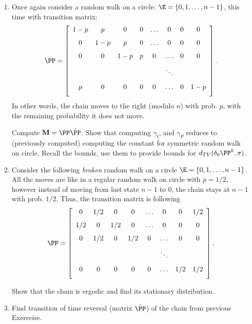 \documentclass[a4paper,12pt]{article}
\begin{document}
 
\noindent
 {
\setlength\fboxsep{4pt}%
 \setlength\fboxrule{2pt}%
 } \bigskip\bigskip
\par \bigskip

  


\begin{enumerate}
 \item Once again consider a random walk on a circle: $\E=\{0,1,\ldots,n-1\}$, this time 
 with transition matrix:
 $$\PP=\left[
 \begin{array}{ccccccccc}
 1-p & p & 0 & 0  & \ldots & 0& 0 & 0\\[7pt]
 0 & 1-p & p & 0 & \ldots & 0 &0&0\\[7pt]
 0 & 0 & 1-p & p & 0 &\ldots & 0 &0\\[7pt]
   &    &     &   &   & \ddots & & \\[7pt]
 p & 0 & 0 & 0 & 0 &\ldots & 0 &1-p\\[7pt]
 \end{array}\right].$$
 In other words, the chain moves to the right (modulo $n$) with prob. $p$, with the remaining 
 probability it does not move.
 
 \par 
 
 Compute  $\mathbf{M}=\PP\tilde{\PP}$. Show that computing 
  $\gamma_C$ and $\gamma_P$ reduces to (previously computed) computing the constant for 
  symmetric random walk on circle. Recall the bounds, use them 
  to provide  bounds for  $d_{TV}(\delta_0\PP^k,\pi)$.
  
  
  \item Consider the following \textsl{broken} random walk on a circle $\E=\{0,1,\ldots,n-1\}$. 
  All the moves are like in a regular random walk on circle with $p=1/2$, however 
  instead of moving from last state $n-1$ to $0$, the chain stays at $n-1$ with prob. $1/2$.
  Thus, the transition matrix is following
 $$\PP=\left[
 \begin{array}{ccccccccc}
 0 & 1/2 & 0 & 0  & \ldots & 0& 0 & 1/2\\[7pt]
 1/2 & 0 & 1/2 & 0 & \ldots & 0 &0&0\\[7pt]
 0 & 1/2 & 0 & 1/2 & 0 &\ldots & 0 &0\\[7pt]
   &    &     &   &   & \ddots & & \\[7pt]
 0 & 0 & 0 & 0 & 0 &\ldots & 1/2&1/2\\[7pt]
 \end{array}\right].$$
 
 Show that the chain is ergodic and find its stationary distribution.
 
 \item Find transition of time reversal (matrix $\tilde{\PP}$) of the chain from previous Exerecise.
   
\end{enumerate}
\end{document}
